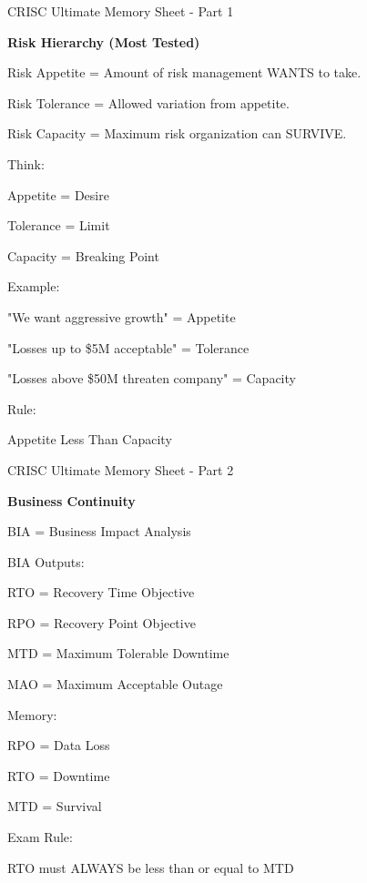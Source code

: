\documentclass{beamer}
\begin{document}
	
	\begin{frame}[shrink=5]{CRISC Ultimate Memory Sheet - Part 1}
		\footnotesize
		
		\textbf{Risk Hierarchy (Most Tested)}
		
		Risk Appetite
		= Amount of risk management WANTS to take.
		
		Risk Tolerance
		= Allowed variation from appetite.
		
		Risk Capacity
		= Maximum risk organization can SURVIVE.
		
		\medskip
		
		Think:
		
		Appetite = Desire
		
		Tolerance = Limit
		
		Capacity = Breaking Point
		
		\medskip
		
		Example:
		
		"We want aggressive growth"
		= Appetite
		
		"Losses up to \$5M acceptable"
		= Tolerance
		
		"Losses above \$50M threaten company"
		= Capacity
		
		\medskip
		
		Rule:
		
		Appetite Less Than Capacity
		
	\end{frame}
	
	\begin{frame}[shrink=5]{CRISC Ultimate Memory Sheet - Part 2}
		\footnotesize
		
		\textbf{Business Continuity}
		
		BIA
		= Business Impact Analysis
		
		BIA Outputs:
		
		RTO
		= Recovery Time Objective
		
		RPO
		= Recovery Point Objective
		
		MTD
		= Maximum Tolerable Downtime
		
		MAO
		= Maximum Acceptable Outage
		
		\medskip
		
		Memory:
		
		RPO = Data Loss
		
		RTO = Downtime
		
		MTD = Survival
		
		\medskip
		
		Exam Rule:
		
		RTO must ALWAYS be less than or equal to MTD
		
	\end{frame}
	
\end{document}
